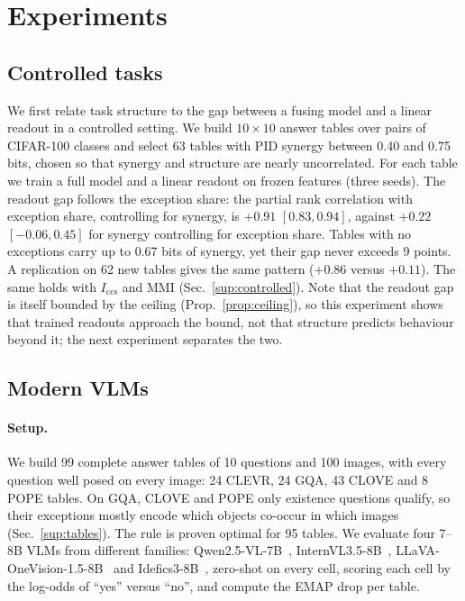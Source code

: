 \section{Experiments}
\label{sec:exp}

\subsection{Controlled tasks}

We first relate task structure to the gap between a fusing model and a linear readout in a controlled setting. We
build $10\times10$ answer tables over pairs of CIFAR-100 classes and select 63 tables with PID synergy between 0.40 and
0.75 bits, chosen so that synergy and structure are nearly uncorrelated. For each table we train a full model and a
linear readout on frozen features (three seeds). The readout gap follows the exception share: the partial rank
correlation with exception share, controlling for synergy, is $+0.91$ $[0.83,0.94]$, against $+0.22$ $[-0.06,0.45]$ for
synergy controlling for exception share. Tables with no exceptions carry up to 0.67 bits of synergy, yet their gap never
exceeds 9 points. A replication on 62 new tables gives the same pattern ($+0.86$ versus $+0.11$). The same holds with
$I_{\mathrm{ccs}}$ and MMI (Sec.~\ref{sup:controlled}). Note that the readout gap is itself bounded by the ceiling
(Prop.~\ref{prop:ceiling}), so this experiment shows that trained readouts approach the bound, not that structure
predicts behaviour beyond it; the next experiment separates the two.

\subsection{Modern VLMs}
\label{sec:vlm}

\paragraph{Setup.}
We build 99 complete answer tables of 10 questions and 100 images, with every question well posed on every image: 24
CLEVR, 24 GQA, 43 CLOVE and 8 POPE tables. On GQA, CLOVE and POPE only existence questions qualify, so their exceptions
mostly encode which objects co-occur in which images (Sec.~\ref{sup:tables}). The rule is proven optimal for 95 tables.
We evaluate four 7--8B VLMs from different families: Qwen2.5-VL-7B~\cite{bai2025qwen25vl},
InternVL3.5-8B~\cite{wang2025internvl35}, LLaVA-OneVision-1.5-8B~\cite{an2025llavaov15} and
Idefics3-8B~\cite{laurencon2024building}, zero-shot on every cell, scoring each cell by the log-odds of ``yes'' versus
``no'', and compute the EMAP drop per table.

